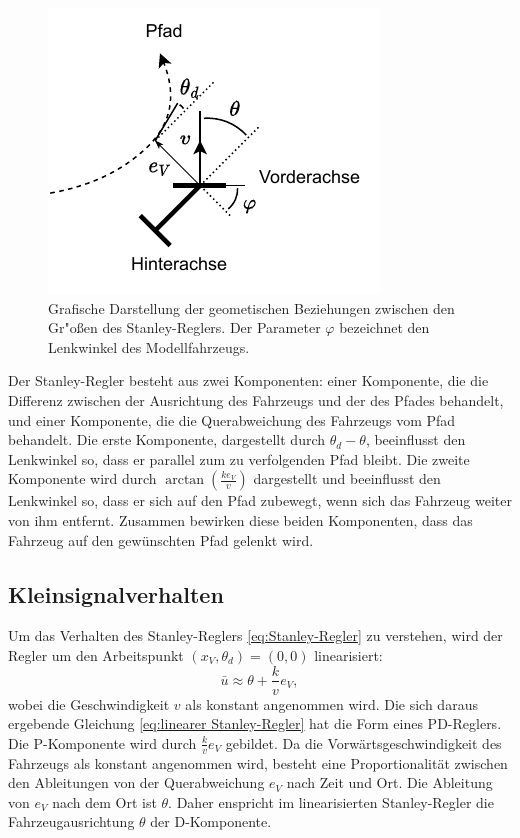 \documentclass[arbeit=studie,oneside,BCOR=12mm]{ArbeitRST}
\begin{document}
\begin{figure}[h]
    \centering
    \includegraphics[scale=1.5]{stanley}
    \caption{Grafische Darstellung der geometischen Beziehungen zwischen
    den Gr"o{\ss}en des Stanley-Reglers. Der Parameter $\varphi$ bezeichnet
    den Lenkwinkel des Modellfahrzeugs.}
    \label{stanley}
\end{figure}

Der Stanley-Regler besteht aus zwei Komponenten: einer Komponente, die die
Differenz zwischen der Ausrichtung des Fahrzeugs und der des Pfades behandelt,
und einer Komponente, die die Querabweichung des Fahrzeugs vom Pfad behandelt.
Die erste Komponente, dargestellt durch $\theta_d - \theta$, beeinflusst den
Lenkwinkel so, dass er parallel zum zu verfolgenden Pfad bleibt. Die zweite
Komponente wird durch $\arctan(\frac{ke_{V}}{v})$ dargestellt und beeinflusst
den Lenkwinkel so, dass er sich auf den Pfad zubewegt, wenn sich das Fahrzeug
weiter von ihm entfernt. Zusammen bewirken diese beiden Komponenten, dass das
Fahrzeug auf den gewünschten Pfad gelenkt wird. \cite{steering-methods}


\subsection{Kleinsignalverhalten}


Um das Verhalten des Stanley-Reglers \eqref{eq:Stanley-Regler} zu verstehen,
wird der Regler um den Arbeitspunkt $\left(x_V, \theta_d\right) = \left(0,
0\right)$ linearisiert: 
\begin{equation} \bar{u} \approx \theta + \frac{k}{v}e_{V}, 
    \label{eq:linearer Stanley-Regler}
\end{equation}
wobei die Geschwindigkeit $v$ als konstant
angenommen wird. Die sich daraus ergebende Gleichung \eqref{eq:linearer
Stanley-Regler} hat die Form eines PD-Reglers. Die P-Komponente wird durch
\(\frac{k}{v}e_{V}\) gebildet. Da die Vorwärtsgeschwindigkeit des Fahrzeugs als
konstant angenommen wird, besteht eine Proportionalität zwischen den
Ableitungen von der Querabweichung \(e_{V}\) nach Zeit und Ort. Die Ableitung
von \(e_{V}\) nach dem Ort ist \(\theta\). Daher enspricht im linearisierten
Stanley-Regler die Fahrzeugausrichtung \(\theta\) der D-Komponente.
\end{document}

